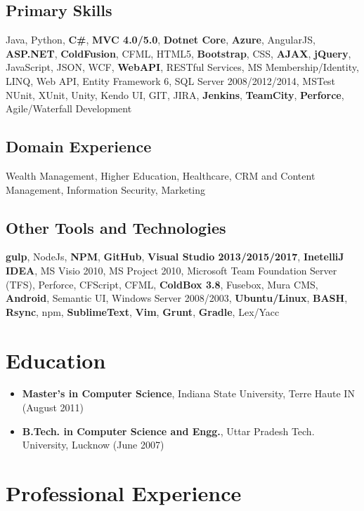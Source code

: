 \documentclass[letterpaper,10pt]{article}
\begin{document}
    \subsection{Primary Skills}
    Java, Python, \textbf{C\#}, \textbf{MVC 4.0/5.0}, \textbf{Dotnet Core}, \textbf{Azure}, AngularJS, \textbf{ASP.NET}, \textbf{ColdFusion}, CFML, HTML5, \textbf{Bootstrap}, CSS, \textbf{AJAX}, \textbf{jQuery}, JavaScript, JSON, WCF, \textbf{WebAPI}, RESTful Services, MS Membership/Identity, LINQ, Web API, Entity Framework 6, SQL Server 2008/2012/2014, MSTest NUnit, XUnit, Unity, Kendo UI, GIT, JIRA, \textbf{Jenkins}, \textbf{TeamCity}, \textbf{Perforce}, Agile/Waterfall Development

    \subsection{Domain Experience}
    Wealth Management, Higher Education, Healthcare, CRM and Content Management, Information Security, Marketing

    \subsection{Other Tools and Technologies}
    \textbf{gulp}, NodeJs, \textbf{NPM}, \textbf{GitHub}, \textbf{Visual Studio 2013/2015/2017}, \textbf{InetelliJ IDEA}, MS Visio 2010, MS Project 2010, Microsoft Team Foundation Server (TFS), Perforce, CFScript, CFML, \textbf{ColdBox 3.8}, Fusebox, Mura CMS, \textbf{Android}, Semantic UI, Windows Server 2008/2003, \textbf{Ubuntu/Linux}, \textbf{BASH}, \textbf{Rsync}, npm, \textbf{SublimeText}, \textbf{Vim}, \textbf{Grunt}, \textbf{Gradle}, Lex/Yacc

    \section{Education}
    \begin{itemize}
        \item \textbf{Master's in Computer Science}, Indiana State University, Terre Haute IN (August 2011)
        \item \textbf{B.Tech. in Computer Science and Engg.}, Uttar Pradesh Tech. University, Lucknow (June 2007)
    \end{itemize}

    \newpage
    \section{Professional Experience}
\end{document}
